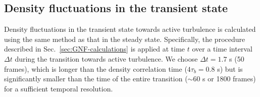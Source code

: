 \documentclass[twocolumn,aps,prx,amsmath,amssymb,longbibliography,superscriptaddress]{revtex4-2}
\begin{document}
\subsection{Density fluctuations in the transient state} \label{appendix-IA-transient}

Density fluctuations in the transient state towards active turbulence is calculated using the same method as that in the steady state. Specifically, the procedure described in Sec.~\ref{sec:GNF-calculations} is applied at time $t$ over a time interval $\Delta t$ during the transition towards active turbulence. We choose $\Delta t = 1.7$ s (50 frames), which is longer than the density correlation time ($4\tau_b = 0.8$ s) but is significantly smaller than the time of the entire transition ($\sim 60$ s or 1800 frames) for a sufficient temporal resolution.



\end{document}
